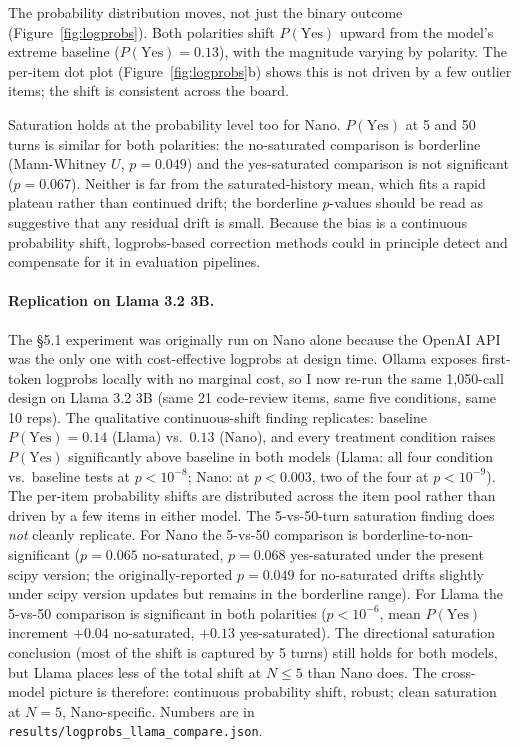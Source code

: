 \documentclass[10pt,twocolumn]{article}
\begin{document}
The probability distribution moves, not just the binary outcome (Figure~\ref{fig:logprobs}).
Both polarities shift $P(\text{Yes})$ upward from the model's extreme baseline ($P(\text{Yes}) = 0.13$), with the magnitude varying by polarity.
The per-item dot plot (Figure~\ref{fig:logprobs}b) shows this is not driven by a few outlier items; the shift is consistent across the board.

Saturation holds at the probability level too for Nano.
$P(\text{Yes})$ at 5 and 50 turns is similar for both polarities: the no-saturated comparison is borderline (Mann-Whitney $U$, $p = 0.049$) and the yes-saturated comparison is not significant ($p = 0.067$).
Neither is far from the saturated-history mean, which fits a rapid plateau rather than continued drift; the borderline $p$-values should be read as suggestive that any residual drift is small.
Because the bias is a continuous probability shift, logprobs-based correction methods \cite{bhatt2026rbcorr} could in principle detect and compensate for it in evaluation pipelines.

\paragraph{Replication on Llama 3.2 3B.}
The §5.1 experiment was originally run on Nano alone because the OpenAI API was the only one with cost-effective logprobs at design time. Ollama exposes first-token logprobs locally with no marginal cost, so I now re-run the same 1,050-call design on Llama 3.2 3B (same 21 code-review items, same five conditions, same 10 reps). The qualitative continuous-shift finding replicates: baseline $P(\text{Yes}) = 0.14$ (Llama) vs.\ $0.13$ (Nano), and every treatment condition raises $P(\text{Yes})$ significantly above baseline in both models (Llama: all four condition vs.\ baseline tests at $p < 10^{-8}$; Nano: at $p < 0.003$, two of the four at $p < 10^{-9}$). The per-item probability shifts are distributed across the item pool rather than driven by a few items in either model.
The 5-vs-50-turn saturation finding does \emph{not} cleanly replicate. For Nano the 5-vs-50 comparison is borderline-to-non-significant ($p = 0.065$ no-saturated, $p = 0.068$ yes-saturated under the present scipy version; the originally-reported $p = 0.049$ for no-saturated drifts slightly under scipy version updates but remains in the borderline range). For Llama the 5-vs-50 comparison is significant in both polarities ($p < 10^{-6}$, mean $P(\text{Yes})$ increment $+0.04$ no-saturated, $+0.13$ yes-saturated). The directional saturation conclusion (most of the shift is captured by 5 turns) still holds for both models, but Llama places less of the total shift at $N \leq 5$ than Nano does. The cross-model picture is therefore: continuous probability shift, robust; clean saturation at $N = 5$, Nano-specific. Numbers are in \texttt{results/logprobs\_llama\_compare.json}.
\end{document}
